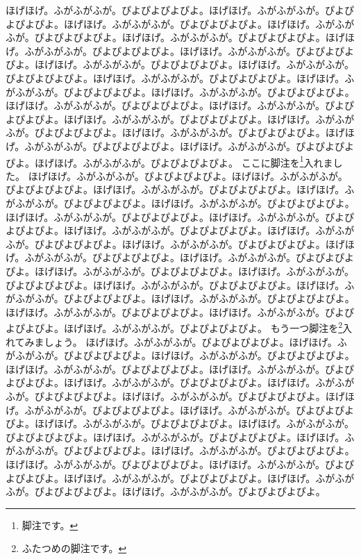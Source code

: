 \documentclass[a4paper,twocolumn]{tarticle}
\def\hoge{ほげほげ。ふがふがふが。ぴよぴよぴよぴよ。}
\def\HOGE{\hoge\hoge\hoge\hoge\hoge\hoge\hoge\hoge\hoge\hoge}
\begin{document}
\HOGE\HOGE
ここに脚注を\footnote{脚注です。}入れました。
\HOGE\HOGE
もう一つ脚注を\footnote{ふたつめの脚注です。}入れてみましょう。
\HOGE\HOGE
\end{document}
